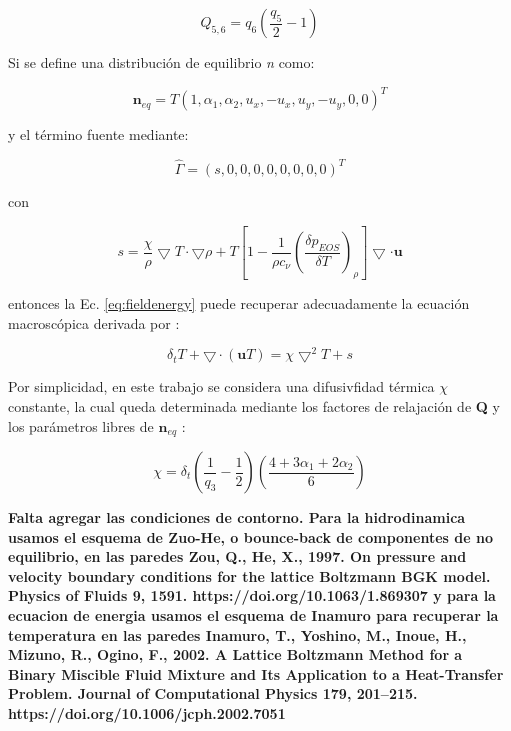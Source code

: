 \begin{equation}
    Q_{5,6} = q_{6} \left( \frac{q_{5}}{2} - 1 \right)
\end{equation}

Si se define una distribución de equilibrio \textit{n} como:

\begin{equation}
    {\mathbf{n}}_{eq} = T { \left( 1, \alpha_{1}, \alpha_{2}, u_{x}, -u_{x}, u_{y}, -u_{y}, 0, 0 \right) }^{T}
\end{equation}

y el término fuente mediante:

\begin{equation}
    \hat{\Gamma} = {( s, 0, 0, 0, 0, 0, 0, 0, 0 )}^{T}
\end{equation}

con 

\begin{equation}
    s = \frac{\chi}{\rho} \bigtriangledown T \cdot \bigtriangledown \rho + T \left[ 1 - \frac{1}{\rho c_{\nu}} {\left( \frac{\delta p_{EOS}}{\delta T} \right)}_{\rho} \right] \bigtriangledown \cdot \mathbf{u}
\end{equation}

entonces la Ec. \ref{eq:fieldenergy} puede recuperar adecuadamente la ecuación macroscópica derivada por \cite{markus2011simulation}:

\begin{equation}
    \delta_{t} T + \bigtriangledown \cdot ( \mathbf{u} T ) = \chi {\bigtriangledown }^{2} T + s
\end{equation}

Por simplicidad, en este trabajo se considera una difusivfidad térmica $\chi$ constante, la cual queda determinada mediante los factores de relajación de \textbf{Q} y los parámetros libres de ${\textbf{n}}_{eq}$ :

\begin{equation}
    \chi = \delta_{t} \left( \frac{1}{q_{3}} - \frac{1}{2} \right) \left( \frac{ 4 + 3 \alpha_{1} + 2 \alpha_{2}}{6} \right)
\end{equation}


\textbf{Falta agregar las condiciones de contorno. Para la hidrodinamica usamos el esquema de Zuo-He, o bounce-back de componentes de no equilibrio, en las paredes
Zou, Q., He, X., 1997. On pressure and velocity boundary conditions for the lattice Boltzmann BGK model. Physics of Fluids 9, 1591. https://doi.org/10.1063/1.869307
y para la ecuacion de energia usamos el esquema de Inamuro para recuperar la temperatura en las paredes
Inamuro, T., Yoshino, M., Inoue, H., Mizuno, R., Ogino, F., 2002. A Lattice Boltzmann Method for a Binary Miscible Fluid Mixture and Its Application to a Heat-Transfer Problem. Journal of Computational Physics 179, 201–215. https://doi.org/10.1006/jcph.2002.7051
}

